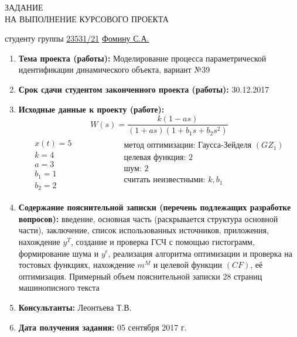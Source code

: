 \documentclass[a4paper, 12pt]{article}
\begin{document}
\newpage
\thispagestyle{empty}
\begin{center}
    ЗАДАНИЕ\\
    НА ВЫПОЛНЕНИЕ КУРСОВОГО ПРОЕКТА
\end{center}

\noindent студенту группы \uline{\hspace{0.5cm}23531/21\hspace{0.5cm}} \quad \uline{\hfill Фомину С.А.\hfill}

\vspace{0.5cm}

\begin{enumerate}
    \item
        \textbf{Тема проекта (работы):} Моделирование процесса параметрической идентификации динамического объекта, вариант №39
    \item
        \textbf{Срок сдачи студентом законченного проекта (работы):} 30.12.2017
    \item
        \textbf{Исходные данные к проекту (работе):}
            $$W(s) = \frac{k(1-as)}{(1+as)(1+b_1s+b_2s^2)}$$
            $$
                \begin{matrix}
                    \begin{aligned}
                        x(t) = 5 \\
                        k = 4 \\
                        a = 3 \\
                        b_1 = 1 \\
                        b_2 = 2
                    \end{aligned}
                    &
                    \hspace{2cm}
                    \begin{aligned}
                        \text{метод оптимизации: Гаусса-Зейделя $(GZ_1)$} \\
                        \text{целевая функция: 2} \\
                        \text{шум: 2} \\
                        \text{считать неизвестными: $k, b_1$} \\
                    \end{aligned}
                \end{matrix}
            $$
    \item
        \textbf{Содержание пояснительной записки (перечень подлежащих разработке вопросов):} введение, основная часть (раскрывается структура основной части), заключение, список использованных источников, приложения, нахождение $y^T$, создание и проверка ГСЧ с помощью гистограмм, формирование шума и $y^\epsilon$, реализация алгоритма оптимизации и проверка на тостовых функциях, нахождение $m^M$ и целевой функции $(CF)$, её оптимизация. Примерный объем пояснительной записки 28 страниц машинописного текста
    \item
        \textbf{Консультанты:} Леонтьева Т.В.
    \item
        \textbf{Дата получения задания:} 05 сентября 2017 г.
\end{enumerate}
\end{document}

